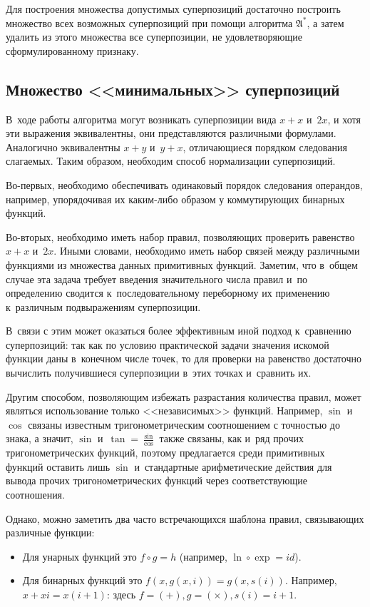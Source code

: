 \documentclass[12pt,a4paper]{amsart}
\begin{document}
Для построения множества допустимых суперпозиций достаточно построить
множество всех возможных суперпозиций при помощи алгоритма $\mathfrak{A}^*$,
а затем удалить из этого множества все суперпозиции, не удовлетворяющие
сформулированному признаку.

\subsection{Множество <<минимальных>> суперпозиций}

В~ходе работы алгоритма могут возникать суперпозиции вида $x + x$ и~$2x$,
и хотя эти выражения эквивалентны, они представляются различными формулами.
Аналогично эквивалентны $x + y$ и~$y + x$, отличающиеся порядком следования
слагаемых. Таким образом, необходим способ нормализации суперпозиций.

Во-первых, необходимо обеспечивать одинаковый порядок следования операндов,
например, упорядочивая их каким-либо образом у коммутирующих бинарных функций.

Во-вторых, необходимо иметь набор правил, позволяющих проверить равенство
$x + x$ и~$2x$. Иными словами, необходимо иметь набор связей между различными
функциями из множества данных примитивных функций. Заметим, что в~общем
случае эта задача требует введения значительного числа правил и~по определению
сводится к~последовательному переборному их применению к~различным
подвыражениям суперпозиции.

В~связи с этим может оказаться более эффективным иной подход к~сравнению
суперпозиций: так как по условию практической задачи значения искомой функции
даны в~конечном числе точек, то для проверки на равенство достаточно вычислить
получившиеся суперпозиции в~этих точках и~сравнить их.

Другим способом, позволяющим избежать разрастания количества правил, может
являться использование только <<независимых>> функций. Например, $\sin$ и
$\cos$ связаны известным тригонометрическим соотношением с точностью до знака,
а значит, $\sin$ и~$\tan = \frac{\sin}{\cos}$ также связаны, как и~ряд прочих
тригонометрических функций, поэтому предлагается среди примитивных функций
оставить лишь $\sin$ и~стандартные арифметические действия для вывода прочих
тригонометрических функций через соответствующие соотношения.

Однако, можно заметить два часто встречающихся шаблона правил, связывающих
различные функции:
\begin{itemize}
  \item Для унарных функций это $f \circ g = h$ (например,
	$\ln \circ \exp = id$).
  \item Для бинарных функций это $ f (x, g (x, i)) = g (x, s (i)) $.
	Например, $x + xi = x(i+1)$: здесь $f = (+), g = (\times), s(i) = i + 1$.
\end{itemize}
\end{document}
